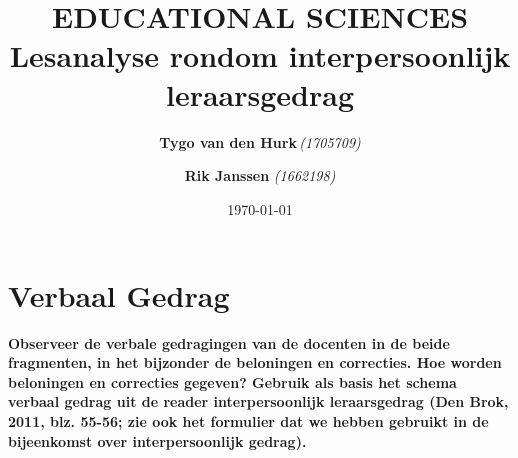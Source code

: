 \documentclass{article}
\title{ 
    \normalsize 
    \textsc{} \\
    [2.0cm]
    \HRule{1.5pt} \\
    \LARGE \textbf{
        \uppercase{
            Educational sciences}
    \HRule{2.0pt} \\ 
    [0.6cm] 
    \LARGE{
        Lesanalyse rondom interpersoonlijk leraarsgedrag} 
    \vspace*{
        10\baselineskip}}
}
\date{\today}
\author{
    \textbf{Tygo van den Hurk}\,\orcidlink{0009-0003-4182-5076}\textit{(1705709)} \and
    \textbf{Rik Janssen} \textit{(1662198)}
}
\begin{document}
    \maketitle 
    \newpage
    \clearpage
    \tableofcontents
    \clearpage
    \newpage
    \section{Verbaal Gedrag}
        \textbf{Observeer de verbale gedragingen van de docenten in de beide 
        fragmenten, in het bijzonder de beloningen en correcties. Hoe worden 
        beloningen en correcties gegeven? Gebruik als basis het schema verbaal 
        gedrag uit de reader interpersoonlijk leraarsgedrag (Den Brok, 2011, blz. 
        55-56; zie ook het formulier dat we hebben gebruikt in de bijeenkomst over 
        interpersoonlijk gedrag).}
\end{document}
